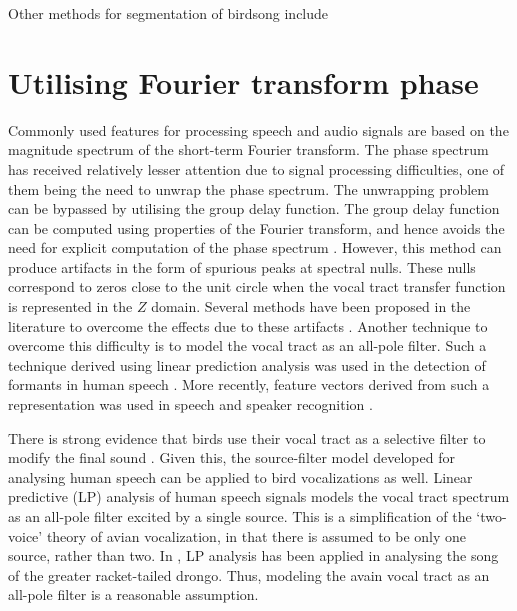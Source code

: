 \documentclass[a4paper]{article}
\begin{document}
Other methods for segmentation of birdsong include

\section{Utilising Fourier transform phase}

Commonly used features for processing speech and audio signals are based on the
magnitude spectrum of the short-term Fourier transform. The phase spectrum has
received relatively lesser attention due to signal processing difficulties, one
of them being the need to unwrap the phase spectrum. The unwrapping problem can be
bypassed by utilising the group delay function. The group delay function can be
computed using properties of the Fourier transform, and hence avoids the need
for explicit computation of the phase spectrum \cite{gdDeriv}. 
However, this method can produce
artifacts in the form of spurious peaks at spectral nulls. These nulls
correspond to zeros close to the unit circle when the vocal tract transfer
function is represented in the $Z$ domain. 
Several methods have been proposed in the literature to overcome the effects due
to these artifacts \cite{modgdf, productSpectrum}. Another technique to overcome
this difficulty is to model the vocal tract as an all-pole filter. Such a
technique derived using linear prediction analysis was used in the detection of
formants in human speech \cite{yegnaFormant}. More recently, feature vectors
derived from such a representation was used in speech \cite{drugman} and speaker
recognition \cite{padman}. 

There is strong evidence that birds use their vocal tract as a selective filter
to modify the final sound \cite{catchpole}.  Given this, the source-filter model
developed for analysing human speech can be applied to bird vocalizations as
well.  Linear predictive (LP) analysis of human speech signals models the vocal
tract spectrum as an all-pole filter \cite{makhoul} excited by a single source.
This is a simplification of the `two-voice' theory of avian vocalization, in
that there is assumed to be only one source, rather than two.  In
\cite{agnihotri}, LP analysis has been applied in analysing the song of the
greater racket-tailed drongo. Thus, modeling the avain vocal tract as an
all-pole filter is a reasonable assumption.



\end{document}
